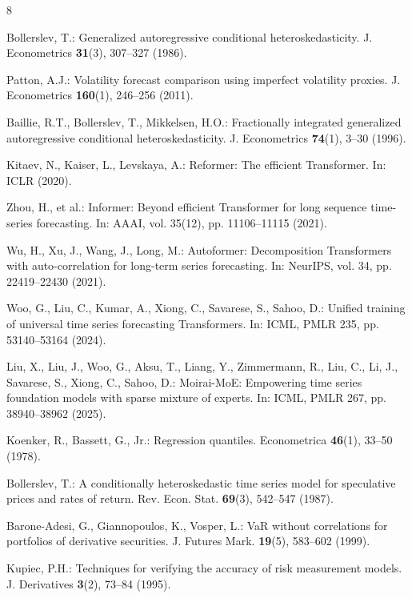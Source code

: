 \documentclass[runningheads]{llncs}
\begin{document}
\begin{thebibliography}{8}

Bollerslev, T.: Generalized autoregressive conditional heteroskedasticity. J. Econometrics \textbf{31}(3), 307--327 (1986).

Patton, A.J.: Volatility forecast comparison using imperfect volatility proxies. J. Econometrics \textbf{160}(1), 246--256 (2011).

Baillie, R.T., Bollerslev, T., Mikkelsen, H.O.: Fractionally integrated generalized autoregressive conditional heteroskedasticity. J. Econometrics \textbf{74}(1), 3--30 (1996).

Kitaev, N., Kaiser, L., Levskaya, A.: Reformer: The efficient Transformer. In: ICLR (2020).

Zhou, H., et al.: Informer: Beyond efficient Transformer for long sequence time-series forecasting. In: AAAI, vol. 35(12), pp. 11106--11115 (2021).

Wu, H., Xu, J., Wang, J., Long, M.: Autoformer: Decomposition Transformers with auto-correlation for long-term series forecasting. In: NeurIPS, vol. 34, pp. 22419--22430 (2021).

Woo, G., Liu, C., Kumar, A., Xiong, C., Savarese, S., Sahoo, D.: Unified training of universal time series forecasting Transformers. In: ICML, PMLR 235, pp. 53140--53164 (2024).

Liu, X., Liu, J., Woo, G., Aksu, T., Liang, Y., Zimmermann, R., Liu, C., Li, J., Savarese, S., Xiong, C., Sahoo, D.: Moirai-MoE: Empowering time series foundation models with sparse mixture of experts. In: ICML, PMLR 267, pp. 38940--38962 (2025).

Koenker, R., Bassett, G., Jr.: Regression quantiles. Econometrica \textbf{46}(1), 33--50 (1978).

Bollerslev, T.: A conditionally heteroskedastic time series model for speculative prices and rates of return. Rev. Econ. Stat. \textbf{69}(3), 542--547 (1987).

Barone-Adesi, G., Giannopoulos, K., Vosper, L.: VaR without correlations for portfolios of derivative securities. J. Futures Mark. \textbf{19}(5), 583--602 (1999).

Kupiec, P.H.: Techniques for verifying the accuracy of risk measurement models. J. Derivatives \textbf{3}(2), 73--84 (1995).


\end{thebibliography}
\end{document}
